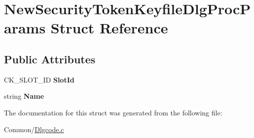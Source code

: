 \hypertarget{struct_new_security_token_keyfile_dlg_proc_params}{}\section{New\+Security\+Token\+Keyfile\+Dlg\+Proc\+Params Struct Reference}
\label{struct_new_security_token_keyfile_dlg_proc_params}
\subsection*{Public Attributes}
\begin{DoxyCompactItemize}
\item 
\mbox{\label{struct_new_security_token_keyfile_dlg_proc_params_abb0b005ebcfba13bdc2751b29407ffec}} 
C\+K\+\_\+\+S\+L\+O\+T\+\_\+\+ID {\bfseries Slot\+Id}
\item 
\mbox{\label{struct_new_security_token_keyfile_dlg_proc_params_a812d6cacd5bd602d7f1e7b4216eee160}} 
string {\bfseries Name}
\end{DoxyCompactItemize}


The documentation for this struct was generated from the following file\+:\begin{DoxyCompactItemize}
\item 
Common/\hyperlink{_dlgcode_8c}{Dlgcode.\+c}\end{DoxyCompactItemize}
